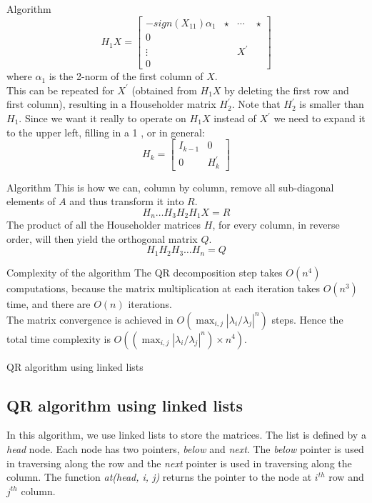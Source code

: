 \begin{frame}{Algorithm}
    $$
    H_{1} X=\left[\begin{array}{cccc}
    -sign(X_{11})\alpha_{1} & \star & \cdots & \star \\
    0 & & & \\
    \vdots & & X^{\prime} & \\
    0 & & &
    \end{array}\right]
    $$
    where $\alpha_1$ is the 2-norm of the first column of $X$.\\
    This can be repeated for $X^{\prime}$ (obtained from $H_{1} X$ by deleting the first row and first column), resulting in a Householder matrix $H_{2}^{\prime} .$ Note that $H_{2}^{\prime}$ is smaller than $H_{1}$. Since we want it really to operate on $H_{1} X$ instead of $X^{\prime}$ we need to expand it to the upper left, filling in a 1 , or in general:
    $$
    H_{k}=\left[\begin{array}{cc}
    I_{k-1} & 0 \\
    0 & H_{k}^{\prime}
    \end{array}\right]
    $$
\end{frame}

\begin{frame}{Algorithm}
This is how we can, column by column, remove all sub-diagonal elements of $A$ and thus transform it into $R$.
$$H_{n} \ldots H_{3} H_{2} H_{1} X=R$$
The product of all the Householder matrices $H$, for every column, in reverse order, will then yield the orthogonal matrix $Q$.
$$
H_{1} H_{2} H_{3} \ldots H_{n}=Q
$$
\end{frame}

\begin{frame}{Complexity of the algorithm}
    The QR decomposition step takes $O(n ^ 4)$ computations, because the matrix multiplication at each iteration takes $O(n^3)$ time, and there are $O(n)$ iterations. \\
    The matrix convergence is achieved in $O(\max_{i, j} |\lambda_i / \lambda_j| ^ n)$ steps. Hence the total time complexity is $O((\max_{i, j} |\lambda_i / \lambda_j| ^ n) \times n ^ 4)$.
\end{frame}

\begin{frame}{QR algorithm using linked lists}
   \subsection{QR algorithm using linked lists}
    In this algorithm, we use linked lists to store the matrices. The list is defined by a \textit{head} node. Each node has two pointers, \textit{below} and \textit{next}. The \textit{below} pointer is used in traversing along the row and the \textit{next} pointer is used in traversing along the column. The function \textit{at(head, i, j)} returns the pointer to the node at $i^{th}$ row and $j^{th}$ column.  
\end{frame}

